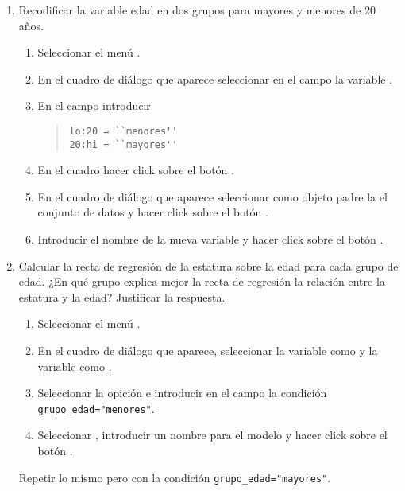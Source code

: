 \begin{enumerate}[leftmargin=*]
\begin{enumerate}
\item Recodificar la variable edad en dos grupos para mayores y menores de 20 años.
\begin{indicacion}{
\begin{enumerate}
\item Seleccionar el menú .
\item En el cuadro de diálogo que aparece seleccionar en el campo  la variable
.
\item En el campo  introducir
\begin{quote}
\lstinline{lo:20 = ``menores''}\\
\lstinline{20:hi = ``mayores''}
\end{quote}
\item En el cuadro  hacer click sobre el botón .
\item En el cuadro de diálogo que aparece seleccionar como objeto padre la el conjunto de datos  y hacer click sobre el botón .
\item Introducir el nombre de la nueva variable  y hacer click sobre el botón .
\end{enumerate}}
\end{indicacion}

\item Calcular la recta de regresión de la estatura sobre la edad para cada grupo de edad. 
¿En qué grupo explica mejor la recta de regresión la relación entre la estatura y la edad? 
Justificar la respuesta.
\begin{indicacion}{
\begin{enumerate}
\item Seleccionar el menú .
\item En el cuadro de diálogo que aparece, seleccionar la variable  como 
y la variable  como .
\item Seleccionar la opición  e introducir en el campo  la condición
\lstinline{grupo_edad="menores"}.
\item Seleccionar , introducir un nombre para el modelo y hacer click sobre el botón
.
\end{enumerate}
Repetir lo mismo pero con la condición \lstinline{grupo_edad="mayores"}.}
\end{indicacion}


\end{enumerate}
\end{enumerate}
